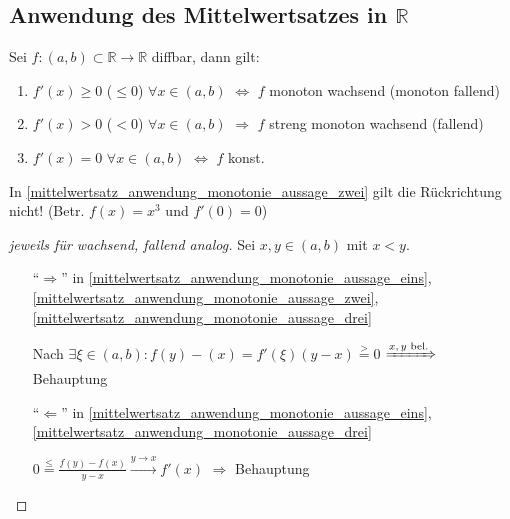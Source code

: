 \subsection{Anwendung des Mittelwertsatzes in $\mathbb{R}$}
\begin{proposition}[Monotonie]
	Sei $f:(a,b)\subset\mathbb{R}\to \mathbb{R}$ \gls{diffbar}, dann gilt:
	\begin{enumerate}[label={\roman*)}]
		\item {}$f'(x) \ge 0$ ($\le 0$) $\forall x\in (a,b)$ $\Leftrightarrow$ $f$ monoton wachsend (monoton fallend)
		\item {} 	$f'(x) > 0$ ($< 0$) $\forall x\in (a,b)$ $\Rightarrow$ $f$ streng monoton wachsend (fallend)
		\item {} $f'(x) = 0$ $\forall x\in (a,b)$ $\Leftrightarrow$ $f$ konst.
	\end{enumerate}
\end{proposition}

\begin{remark}
	In \ref{mittelwertsatz_anwendung_monotonie_aussage_zwei} gilt die Rückrichtung nicht! (Betr. $f(x) = x^3$ und $f'(0) = 0$)
\end{remark}

\begin{proof}[jeweils für wachsend, fallend analog]
	Sei $x,y\in (a,b)$ mit $x < y$.
	\begin{itemize}[topsep=\dimexpr -\baselineskip / 2 \relax]
		\item["`$\Rightarrow$"'] in \ref{mittelwertsatz_anwendung_monotonie_aussage_eins}, \ref{mittelwertsatz_anwendung_monotonie_aussage_zwei}, \ref{mittelwertsatz_anwendung_monotonie_aussage_drei}
		
		Nach  $\exists \xi\in(a,b): f(y) - (x) = f'(\xi) (y - x) \stackrel{>}{=} 0$ $\xRightarrow{\text{$x,y$ bel.}}$ Behauptung
		
		\item["`$\Leftarrow$"'] in \ref{mittelwertsatz_anwendung_monotonie_aussage_eins}, \ref{mittelwertsatz_anwendung_monotonie_aussage_drei}
		
		$0 \stackrel{\le}{=} \frac{f(y) - f(x)}{y - x} \xrightarrow{y\to x} f'(x)$ $\Rightarrow$ Behauptung
	\end{itemize}
\end{proof}

